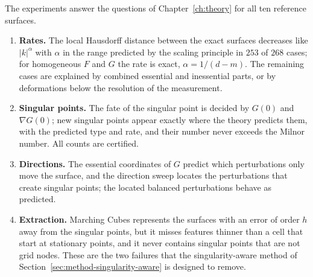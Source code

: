 The experiments answer the questions of Chapter~\ref{ch:theory} for all ten
reference surfaces.
\begin{enumerate}
    \item \textbf{Rates.} The local Hausdorff distance between the exact
          surfaces decreases like $|k|^\alpha$ with $\alpha$ in the range
          predicted by the scaling principle in $253$ of $268$ cases; for
          homogeneous $F$ and $G$ the rate is exact, $\alpha=1/(d-m)$. The
          remaining cases are explained by combined essential and inessential
          parts, or by deformations below the resolution of the measurement.
    \item \textbf{Singular points.} The fate of the singular point is decided by
          $G(0)$ and $\nabla G(0)$; new singular points appear exactly where the
          theory predicts them, with the predicted type and rate, and their
          number never exceeds the Milnor number. All counts are certified.
    \item \textbf{Directions.} The essential coordinates of $G$ predict which
          perturbations only move the surface, and the direction sweep locates
          the perturbations that create singular points; the located balanced
          perturbations behave as predicted.
    \item \textbf{Extraction.} Marching Cubes represents the surfaces with an
          error of order $h$ away from the singular points, but it misses
          features thinner than a cell that start at stationary points, and it
          never contains singular points that are not grid nodes. These are the
          two failures that the singularity-aware method of
          Section~\ref{sec:method-singularity-aware} is designed to remove.
\end{enumerate}
